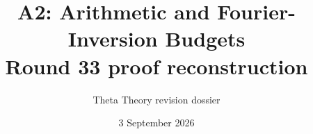 \documentclass[11pt]{article}
\title{A2: Arithmetic and Fourier-Inversion Budgets\\\large Round 33 proof reconstruction}
\author{Theta Theory revision dossier}
\date{3 September 2026}
\begin{document}
\maketitle
\reviewnote

\end{document}
